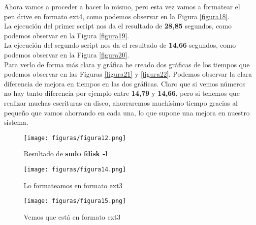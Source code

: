 Ahora vamos a proceder a hacer lo mismo, pero esta vez vamos a formatear el pen drive en formato ext4, como podemos observar en la Figura
\ref{figura18}.\\

La ejecución del primer script nos da el resultado de \textbf{28,85} segundos, como podemos observar en la Figura \ref{figura19}.\\
La ejecución del segundo script nos da el resultado de \textbf{14,66} segundos, como podemos observar en la Figura \ref{figura20}.\\

Para verlo de forma más clara y gráfica he creado dos gráficas de los tiempos que podemos observar en las Figuras \ref{figura21} y \ref{figura22}. Podemos observar la clara diferencia de mejora en tiempos en las dos gráficas. Claro que si vemos números no hay tanto diferencia por ejemplo entre \textbf{14,79} y \textbf{14,66}, pero si tenemos que realizar muchas escrituras en disco, ahorraremos muchísimo tiempo gracias al pequeño que vamos ahorrando en cada una, lo que supone una mejora en nuestro sistema.

\begin{figure}[H] %
	\centering
	\texttt{[image: figuras/figura12.png]}  %
	
	
	\caption{Resultado de \textbf{sudo fdisk -l}}
	\label{figura12}
\end{figure}

\begin{figure}[H] %
	\centering
	\texttt{[image: figuras/figura14.png]}  %
	
	
	\caption{Lo formateamos en formato ext3}
	\label{figura14}
\end{figure}

\begin{figure}[H] %
	\centering
	\texttt{[image: figuras/figura15.png]}  %
	
	
	\caption{Vemos que está en formato ext3}
	\label{figura15}
\end{figure}

